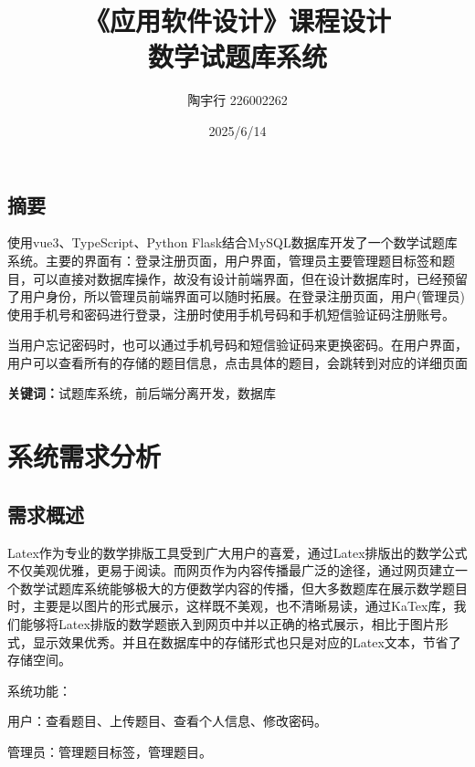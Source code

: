 \documentclass[a4paper,AutoFakeBold={2.7}]{ctexart} %
\title{\heiti \zihao{-2} 《应用软件设计》课程设计 \\ \vspace{20pt} 数学试题库系统}%
\author{陶宇行 \hspace{5pt} 226002262}
\date{2025/6/14}
\begin{document}
\maketitle %

\begin{center}
	\section*{摘要}
\end{center}

使用vue3、TypeScript、Python Flask结合MySQL数据库开发了一个数学试题库系统。主要的界面有：登录注册页面，用户界面，管理员主要管理题目标签和题目，可以直接对数据库操作，故没有设计前端界面，但在设计数据库时，已经预留了用户身份，所以管理员前端界面可以随时拓展。在登录注册页面，用户(管理员)使用手机号和密码进行登录，注册时使用手机号码和手机短信验证码注册账号。

当用户忘记密码时，也可以通过手机号码和短信验证码来更换密码。在用户界面，用户可以查看所有的存储的题目信息，点击具体的题目，会跳转到对应的详细页面

\vspace{5pt}
\noindent \textbf{\heiti 关键词：}\songti 试题库系统，前后端分离开发，数据库

\newpage

\section{系统需求分析}

\subsection{需求概述}

Latex作为专业的数学排版工具受到广大用户的喜爱，通过Latex排版出的数学公式不仅美观优雅，更易于阅读。而网页作为内容传播最广泛的途径，通过网页建立一个数学试题库系统能够极大的方便数学内容的传播，但大多数题库在展示数学题目时，主要是以图片的形式展示，这样既不美观，也不清晰易读，通过KaTex库，我们能够将Latex排版的数学题嵌入到网页中并以正确的格式展示，相比于图片形式，显示效果优秀。并且在数据库中的存储形式也只是对应的Latex文本，节省了存储空间。

系统功能：

用户：查看题目、上传题目、查看个人信息、修改密码。

管理员：管理题目标签，管理题目。
\end{document}
